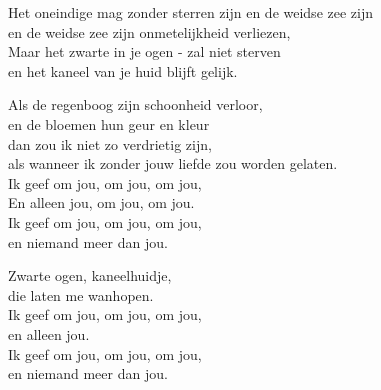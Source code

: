 \clearpage
\begin{translation}
Het oneindige mag zonder sterren zijn en de weidse zee zijn\\
en de weidse zee zijn onmetelijkheid verliezen,\\
Maar het zwarte in je ogen - zal niet sterven\\
en het kaneel van je huid blijft gelijk.\vspace{\wlskip}

Als de regenboog zijn schoonheid verloor,\\
en de bloemen hun geur en kleur\\
dan zou ik niet zo verdrietig zijn,\\
als wanneer ik zonder jouw liefde zou worden gelaten.\\
Ik geef om jou, om jou, om jou,\\
En alleen jou, om jou, om jou.\\
Ik geef om jou, om jou, om jou,\\
en niemand meer dan jou.\vspace{\wlskip}

Zwarte ogen, kaneelhuidje,\\
die laten me wanhopen.\\
Ik geef om jou, om jou, om jou,\\
en alleen jou.\\
Ik geef om jou, om jou, om jou,\\
en niemand meer dan jou. 
\end{translation}
